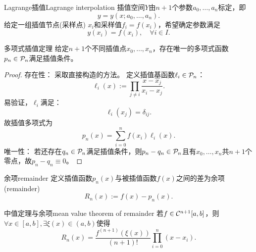 \begin{definition}
    {Lagrange插值}{Lagrange interpolation}
    插值空间$Y$由$n+1$个参数$a_0,\ldots,a_n$标定，即
    \[
        y=y(x;a_0,\ldots,a_n).
    \]
    给定一组插值节点(采样点) $x_i$和采样值$f_i=f(x_i)$，希望确定参数满足
    \begin{equation}
        y(x_i)=f(x_i),\quad\forall i\in I.
    \end{equation}
\end{definition}

\begin{theorem}
    {多项式插值定理}{}
    给定$n+1$个不同插值点$x_0,\ldots,x_n$，存在唯一的多项式函数$p_n\in\mathcal P_n$满足插值条件。
\end{theorem}
\begin{proof}
    存在性：
    采取直接构造的方法。
    定义插值基函数$\ell_i\in\mathcal P_n$：
    \begin{equation}
        \label{eqn:Lagrange base}
        \ell_i(x):=\prod_{j\neq i}\frac{x-x_j}{x_i-x_j}.
    \end{equation}
    易验证，$\ell_i$满足：
    \begin{equation}
        \ell_i(x_j)=\delta_{ij}.
    \end{equation}
    故插值多项式为
    \begin{equation}
        \label{eqn:Lagrange polynomial}
        p_n(x)=\sum_{i=0}^nf(x_i)\ell_i(x).
    \end{equation}
    唯一性：
    若还存在$q_n\in\mathcal P_n$满足插值条件，则$p_n-q_n\in\mathcal P_n$且有$x_0,\ldots,x_n$共$n+1$个零点，故$p_n-q_n\equiv 0$。
\end{proof}

\begin{definition}
    {余项}{remainder}
    定义插值函数$p_n(x)$与被插值函数$f(x)$之间的差为余项(remainder)
    \begin{equation}
        R_n(x):=f(x)-p_n(x).
    \end{equation}
\end{definition}

\begin{theorem}
    {中值定理与余项}{mean value theorem of remainder}
    若$f\in\mathcal C^{n+1}[a,b]$，则$\forall x\in[a,b],\exists\xi(x)\in(a,b)$使得
    \begin{equation}
        \label{eqn:Lagrange remainder}
        R_n(x)=\frac{f^{(n+1)}(\xi(x))}{(n+1)!}\prod_{i=0}^n(x-x_i).
    \end{equation}
\end{theorem}

